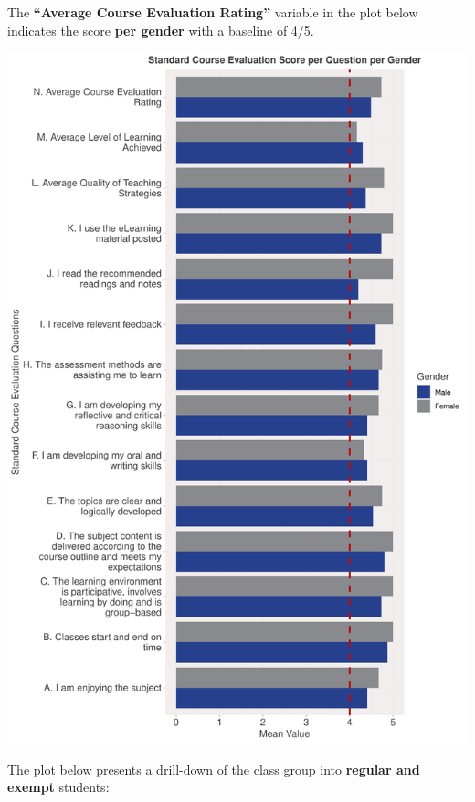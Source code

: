 \documentclass[
]{article}
\begin{document}
\newpage

The \textbf{``Average Course Evaluation Rating''} variable in the plot
below indicates the score \textbf{per gender} with a baseline of 4/5.

\includegraphics{AnalysisOfCourseEvaluation-Notebook_files/figure-latex/VisualizationsForCourseEvaluationResultsperGender-1.pdf}

\newpage

The plot below presents a drill-down of the class group into
\textbf{regular and exempt} students:
\end{document}
